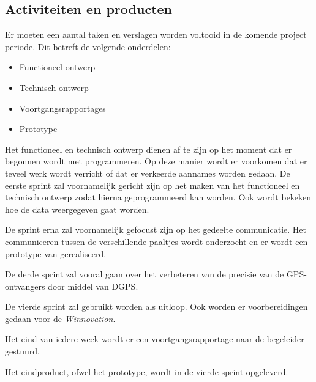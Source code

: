 \subsection{Activiteiten en producten}
Er moeten een aantal taken en verslagen worden voltooid in de komende
project periode. Dit betreft de volgende onderdelen:
\begin{itemize}
    \item Functioneel ontwerp
    \item Technisch ontwerp
    \item Voortgangsrapportages
    \item Prototype
\end{itemize}
Het functioneel en technisch ontwerp dienen af te zijn op het moment dat
er begonnen wordt met programmeren. Op deze manier wordt er voorkomen
dat er teveel werk wordt verricht of dat er verkeerde aannames worden
gedaan. De eerste sprint zal voornamelijk gericht zijn op het maken van
het functioneel en technisch ontwerp zodat hierna geprogrammeerd kan
worden. Ook wordt bekeken hoe de data weergegeven gaat worden.

De sprint erna zal voornamelijk gefocust zijn op het gedeelte communicatie.
Het communiceren tussen de verschillende paaltjes wordt onderzocht en er
wordt een prototype van gerealiseerd.

De derde sprint zal vooral gaan over het verbeteren van de precisie van de
GPS-ontvangers door middel van DGPS.

De vierde sprint zal gebruikt worden als uitloop. Ook worden er voorbereidingen
gedaan voor de \textit{Winnovation}.

Het eind van iedere week wordt er een voortgangsrapportage naar de begeleider
gestuurd.

Het eindproduct, ofwel het prototype, wordt in de vierde sprint opgeleverd.
